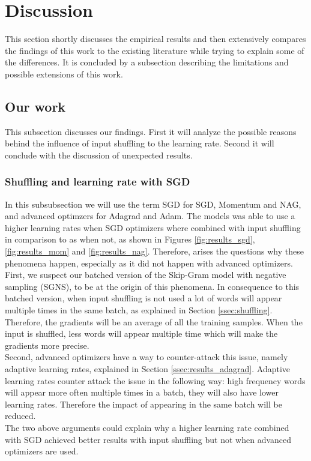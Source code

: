 \section{Discussion}\label{sec:discussion}

This section shortly discusses the empirical results and then extensively compares the findings of this work to the existing literature while trying to explain some of the differences. It is concluded by a subsection describing the limitations and possible extensions of this work. 

\subsection{Our work}
This subsection discusses our findings. First it will analyze the possible reasons behind the influence of input shuffling to the learning rate. Second it will conclude with the discussion of unexpected results. 

\subsubsection{Shuffling and learning rate with SGD}
In this subsubsection we will use the term SGD for SGD, Momentum and NAG, and advanced optimzers for Adagrad and Adam. The models was able to use a higher learning rates when SGD optimizers where combined with input shuffling in comparison to as when not, as shown in Figures \ref{fig:results_sgd}, \ref{fig:results_mom} and \ref{fig:results_nag}. Therefore, arises the questions why these phenomena happen, especially as it did not happen with advanced optimizers.  \\
First, we suspect our batched version of the Skip-Gram model with negative sampling (SGNS), to be at the origin of this phenomena. In consequence to this batched version, when input shuffling is not used a lot of words will appear multiple times in the same batch, as explained in Section \ref{ssec:shuffling}. Therefore, the gradients will be an average of all the training samples. When the input is shuffled, less words will appear multiple time which will make the gradients more precise.\\
Second, advanced optimizers have a way to counter-attack this issue, namely adaptive learning rates, explained in Section \ref{ssec:results_adagrad}. Adaptive learning rates counter attack the issue in the following way: high frequency words  will appear more often multiple times in a batch, they will also have lower learning rates. Therefore the impact of appearing in the same batch will be reduced. \\  The two above arguments could explain why a higher learning rate combined with SGD achieved better results with input shuffling but not when advanced optimizers are used. 

